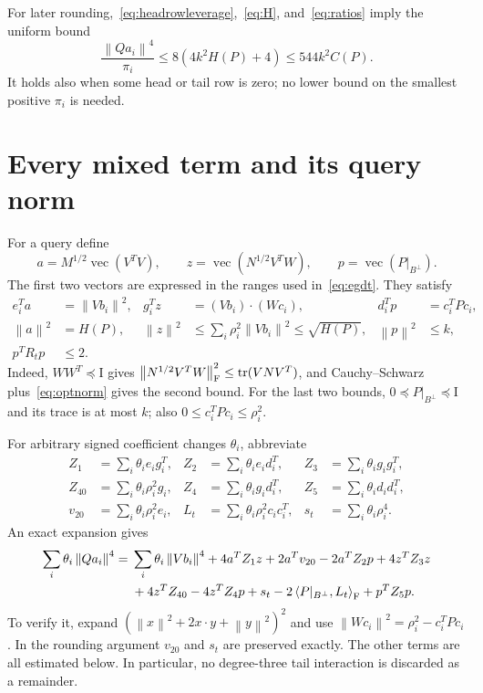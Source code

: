 \documentclass[11pt]{article}
\theoremstyle{remark}\newtheorem{remark}[theorem]{Remark}
\newcommand{\Tr}{\operatorname{tr}}\newcommand{\rank}{\operatorname{rank}}
\newcommand{\vc}{\operatorname{vec}}\newcommand{\diag}{\operatorname{diag}}
\newcommand{\norm}[1]{\left\lVert#1\right\rVert}\newcommand{\abs}[1]{\left|#1\right|}
\newcommand{\ip}[2]{\left\langle#1,#2\right\rangle}
\newcommand{\Id}{\mathrm I}\newcommand{\dbar}{\bar d}
\numberwithin{equation}{section}
\begin{document}
For later rounding,~\eqref{eq:headrowleverage},~\eqref{eq:H}, and~\eqref{eq:ratios} imply the uniform bound
\begin{equation}\label{eq:sensitivity}
 \frac{\norm{Qa_i}^4}{\pi_i}
 \le8\left(4k^2H(P)+4\right)\le544k^2 C(P).
\end{equation}
It holds also when some head or tail row is zero; no lower bound on the smallest positive $\pi_i$ is needed.

\section{Every mixed term and its query norm}\label{sec:contractions}
For a query define
\begin{equation}\label{eq:queryvectors}
 a=M^{1/2}\vc(V^TV),\qquad
 z=\vc(N^{1/2}V^TW),\qquad
 p=\vc(P|_{B^\perp}).
\end{equation}
The first two vectors are expressed in the ranges used in~\eqref{eq:egdt}. They satisfy
\begin{align}
 e_i^Ta&=\norm{Vb_i}^2,&g_i^Tz&=(Vb_i)\cdot(Wc_i),&d_i^Tp&=c_i^TPc_i,\label{eq:queryeval}\\
 \norm a^2&=H(P),&
 \norm z^2&\le\sum_i\rho_i^2\norm{Vb_i}^2\le\sqrt{H(P)},&
 \norm p^2&\le k,\label{eq:querynorms}\\
 p^TR_tp&\le2.&&&&\label{eq:tailquerynorm}
\end{align}
Indeed, $WW^T\preceq\Id$ gives
$\norm{N^{1/2}V^TW}_\Frob^2\le\Tr(VNV^T)$, and Cauchy--Schwarz plus~\eqref{eq:optnorm} gives the second bound. For the last two bounds, $0\preceq P|_{B^\perp}\preceq\Id$ and its trace is at most $k$; also $0\le c_i^TPc_i\le\rho_i^2$.

For arbitrary signed coefficient changes $\theta_i$, abbreviate
\begin{align*}
 Z_1&=\sum_i\theta_i e_i g_i^T,&Z_2&=\sum_i\theta_i e_i d_i^T,&Z_3&=\sum_i\theta_i g_i g_i^T,\\
 Z_{40}&=\sum_i\theta_i\rho_i^2g_i,&Z_4&=\sum_i\theta_i g_i d_i^T,&Z_5&=\sum_i\theta_i d_i d_i^T,\\
 v_{20}&=\sum_i\theta_i\rho_i^2 e_i,&L_t&=\sum_i\theta_i\rho_i^2 c_i c_i^T,&s_t&=\sum_i\theta_i\rho_i^4.
\end{align*}
An exact expansion gives
\begin{align}\label{eq:expansion}
 \sum_i\theta_i\norm{Qa_i}^4
 ={}&\sum_i\theta_i\norm{Vb_i}^4
 +4a^TZ_1z+2a^Tv_{20}-2a^TZ_2p+4z^TZ_3z\notag\\
 &+4z^TZ_{40}-4z^TZ_4p+s_t-2\ip{P|_{B^\perp}}{L_t}_\Frob+p^TZ_5p.
\end{align}
To verify it, expand $(\norm x^2+2x\cdot y+\norm y^2)^2$ and use
$\norm{Wc_i}^2=\rho_i^2-c_i^TPc_i$.
In the rounding argument $v_{20}$ and $s_t$ are preserved exactly. The other terms are all estimated below. In particular, no degree-three tail interaction is discarded as a remainder.
\end{document}
